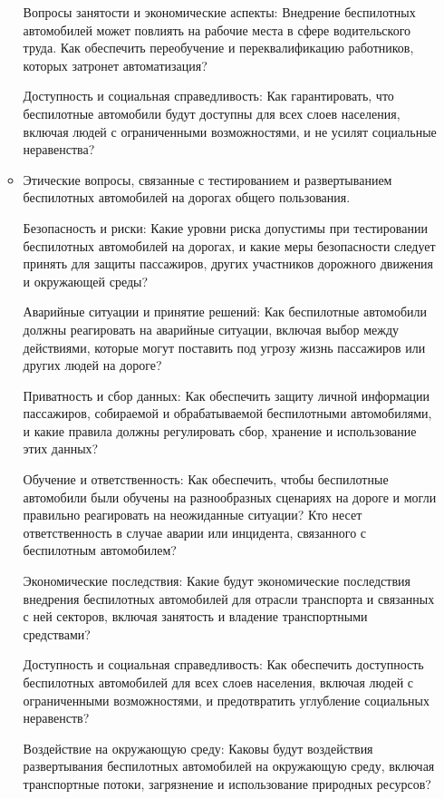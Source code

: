 \documentclass{article}
\begin{document}
\begin{itemize}
\begin{itemize}
        Вопросы занятости и экономические аспекты: Внедрение беспилотных автомобилей может повлиять на рабочие места в сфере водительского труда. Как обеспечить переобучение и переквалификацию работников, которых затронет автоматизация?

        Доступность и социальная справедливость: Как гарантировать, что беспилотные автомобили будут доступны для всех слоев населения, включая людей с ограниченными возможностями, и не усилят социальные неравенства?

        \item Этические вопросы, связанные с тестированием и развертыванием беспилотных автомобилей на дорогах общего пользования.

        Безопасность и риски: Какие уровни риска допустимы при тестировании беспилотных автомобилей на дорогах, и какие меры безопасности следует принять для защиты пассажиров, других участников дорожного движения и окружающей среды?

        Аварийные ситуации и принятие решений: Как беспилотные автомобили должны реагировать на аварийные ситуации, включая выбор между действиями, которые могут поставить под угрозу жизнь пассажиров или других людей на дороге?

        Приватность и сбор данных: Как обеспечить защиту личной информации пассажиров, собираемой и обрабатываемой беспилотными автомобилями, и какие правила должны регулировать сбор, хранение и использование этих данных?

        Обучение и ответственность: Как обеспечить, чтобы беспилотные автомобили были обучены на разнообразных сценариях на дороге и могли правильно реагировать на неожиданные ситуации? Кто несет ответственность в случае аварии или инцидента, связанного с беспилотным автомобилем?

        Экономические последствия: Какие будут экономические последствия внедрения беспилотных автомобилей для отрасли транспорта и связанных с ней секторов, включая занятость и владение транспортными средствами?

        Доступность и социальная справедливость: Как обеспечить доступность беспилотных автомобилей для всех слоев населения, включая людей с ограниченными возможностями, и предотвратить углубление социальных неравенств?

        Воздействие на окружающую среду: Каковы будут воздействия развертывания беспилотных автомобилей на окружающую среду, включая транспортные потоки, загрязнение и использование природных ресурсов?
    \end{itemize}
\end{itemize}
\end{document}
